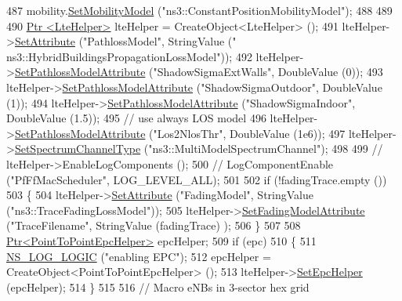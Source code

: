 \begin{DoxyCode}
487   mobility.\hyperlink{classns3_1_1MobilityHelper_a030275011b6f40682e70534d30280aba}{SetMobilityModel} (\textcolor{stringliteral}{"ns3::ConstantPositionMobilityModel"});
488 
489 
490   \hyperlink{classns3_1_1Ptr}{Ptr <LteHelper>} lteHelper = CreateObject<LteHelper> ();
491   lteHelper->\hyperlink{classns3_1_1ObjectBase_ac60245d3ea4123bbc9b1d391f1f6592f}{SetAttribute} (\textcolor{stringliteral}{"PathlossModel"}, StringValue (\textcolor{stringliteral}{"
      ns3::HybridBuildingsPropagationLossModel"}));
492   lteHelper->\hyperlink{classns3_1_1LteHelper_aa96ebbd6845ca61c2b5e08e84481a348}{SetPathlossModelAttribute} (\textcolor{stringliteral}{"ShadowSigmaExtWalls"}, DoubleValue (0));
493   lteHelper->\hyperlink{classns3_1_1LteHelper_aa96ebbd6845ca61c2b5e08e84481a348}{SetPathlossModelAttribute} (\textcolor{stringliteral}{"ShadowSigmaOutdoor"}, DoubleValue (1));
494   lteHelper->\hyperlink{classns3_1_1LteHelper_aa96ebbd6845ca61c2b5e08e84481a348}{SetPathlossModelAttribute} (\textcolor{stringliteral}{"ShadowSigmaIndoor"}, DoubleValue (1.5));
495   \textcolor{comment}{// use always LOS model}
496   lteHelper->\hyperlink{classns3_1_1LteHelper_aa96ebbd6845ca61c2b5e08e84481a348}{SetPathlossModelAttribute} (\textcolor{stringliteral}{"Los2NlosThr"}, DoubleValue (1e6));
497   lteHelper->\hyperlink{classns3_1_1LteHelper_a8629b4cbc04f51c51c3b2431a42b0763}{SetSpectrumChannelType} (\textcolor{stringliteral}{"ns3::MultiModelSpectrumChannel"});
498 
499 \textcolor{comment}{//   lteHelper->EnableLogComponents ();}
500 \textcolor{comment}{//   LogComponentEnable ("PfFfMacScheduler", LOG\_LEVEL\_ALL);}
501 
502   \textcolor{keywordflow}{if} (!fadingTrace.empty ())
503     \{
504       lteHelper->\hyperlink{classns3_1_1ObjectBase_ac60245d3ea4123bbc9b1d391f1f6592f}{SetAttribute} (\textcolor{stringliteral}{"FadingModel"}, StringValue (\textcolor{stringliteral}{"ns3::TraceFadingLossModel"}));
505       lteHelper->\hyperlink{classns3_1_1LteHelper_aedbe5aa68544779474f27d32e4470ada}{SetFadingModelAttribute} (\textcolor{stringliteral}{"TraceFilename"}, StringValue (fadingTrace)
      );
506     \}
507 
508   \hyperlink{classns3_1_1Ptr}{Ptr<PointToPointEpcHelper>} epcHelper;
509   \textcolor{keywordflow}{if} (epc)
510     \{
511       \hyperlink{group__logging_ga88acd260151caf2db9c0fc84997f45ce}{NS\_LOG\_LOGIC} (\textcolor{stringliteral}{"enabling EPC"});
512       epcHelper = CreateObject<PointToPointEpcHelper> ();
513       lteHelper->\hyperlink{classns3_1_1LteHelper_a324079a1ccd54ce949786b83d6b95915}{SetEpcHelper} (epcHelper);
514     \}
515 
516   \textcolor{comment}{// Macro eNBs in 3-sector hex grid}

\end{DoxyCode}
